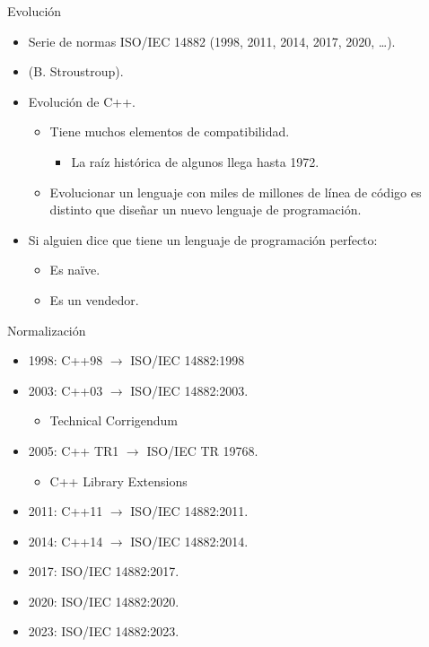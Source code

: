 \begin{frame}{Evolución}
\vspace{-0.5em}
\begin{itemize}
  \item Serie de normas ISO/IEC 14882 (1998, 2011, 2014, 2017, 2020, \ldots).
  \item {} (B. Stroustroup).
  \item Evolución de C++.
    \begin{itemize}
      \item Tiene muchos elementos de compatibilidad.
        \begin{itemize}
          \item La raíz histórica de algunos llega hasta 1972.
        \end{itemize}
      \item Evolucionar un lenguaje con miles de millones de línea de código es
      distinto que diseñar un nuevo lenguaje de programación.
    \end{itemize}
  \item Si alguien dice que tiene un lenguaje de programación perfecto:
    \begin{itemize}
      \item Es na\"{i}ve.
      \item Es un vendedor.
    \end{itemize}
\end{itemize}
\end{frame}

\begin{frame}[t]{Normalización}
\begin{itemize}
  \item 1998: C++98 $\rightarrow$ ISO/IEC 14882:1998
  \item 2003: C++03 $\rightarrow$ ISO/IEC 14882:2003.
    \begin{itemize}
      \item Technical Corrigendum
    \end{itemize}
  \item 2005: C++ TR1 $\rightarrow$ ISO/IEC TR 19768.
    \begin{itemize}
      \item C++ Library Extensions
    \end{itemize}
  \item 2011: C++11 $\rightarrow$ ISO/IEC 14882:2011.
  \item 2014: C++14 $\rightarrow$ ISO/IEC 14882:2014. 
  \item 2017: ISO/IEC 14882:2017.
  \item 2020: ISO/IEC 14882:2020.
  \item 2023:  ISO/IEC 14882:2023.
\end{itemize}
\end{frame}

